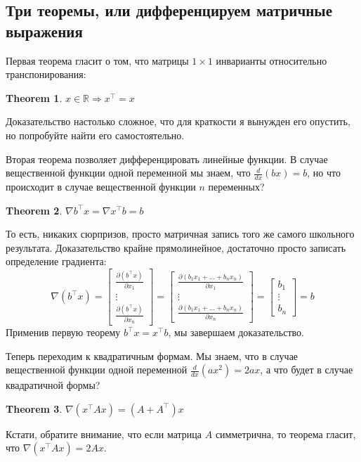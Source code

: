 \documentclass[notitlepage]{report}
\newtheorem{theorem}{Theorem}
\begin{document}
\subsection{Три теоремы, или дифференцируем матричные выражения}
Первая теорема гласит о том, что матрицы $1\times 1$ инварианты относительно транспонирования:
\begin{theorem}
$x\in \mathbb R \Rightarrow x^\top = x$
\end{theorem}
Доказательство настолько сложное, что для краткости я вынужден его опустить, но попробуйте найти его самостоятельно.

Вторая теорема позволяет дифференцировать линейные функции. В случае вещественной функции одной переменной мы знаем, что $\frac{d}{dx}(bx) = b$, но что происходит в случае вещественной функции $n$ переменных?
\begin{theorem}
$\nabla b^\top x = \nabla x^\top b = b$
\end{theorem}
То есть, никаких сюрпризов, просто матричная запись того же самого школьного результата. Доказательство крайне прямолинейное, достаточно просто записать определение градиента:
$$\nabla(b^\top x) = \begin{bmatrix}\frac{\partial (b^\top x)}{\partial x_1} \\ \vdots \\ \frac{\partial (b^\top x)}{\partial x_n} \end{bmatrix} = \begin{bmatrix}\frac{\partial (b_1 x_1 + \dots + b_n x_n)}{\partial x_1} \\ \vdots \\ \frac{\partial (b_1 x_1 + \dots + b_n x_n)}{\partial x_n} \end{bmatrix}
= \begin{bmatrix}b_1 \\ \vdots \\ b_n \end{bmatrix} = b$$
Применив первую теорему $b^\top x = x^\top b$, мы завершаем доказательство.

Теперь переходим к квадратичным формам. Мы знаем, что в случае вещественной функции одной переменной $\frac{d}{dx}(ax^2) = 2ax$, а что будет в случае квадратичной формы?
\begin{theorem}
$\nabla (x^\top A x) = (A+A^\top)x$
\end{theorem}
Кстати, обратите внимание, что если матрица $A$ симметрична, то теорема гласит, что $\nabla (x^\top A x) = 2Ax$.
\end{document}
